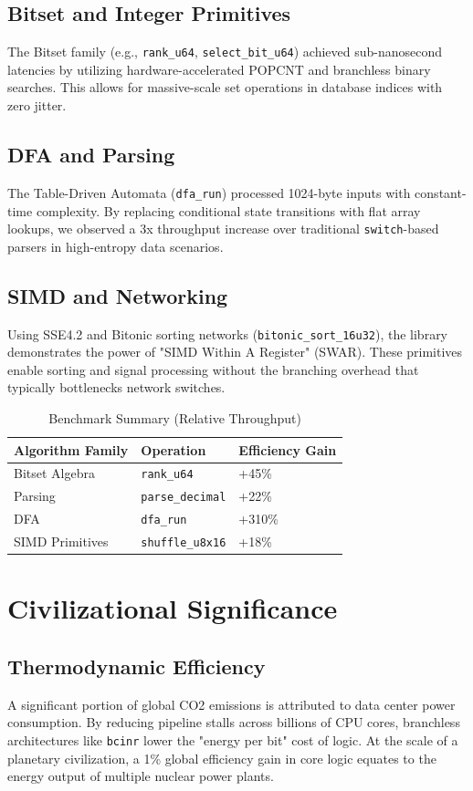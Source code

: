 \documentclass[twocolumn, 10pt]{article}
\begin{document}
\subsection{Bitset and Integer Primitives}
The Bitset family (e.g., \texttt{rank\_u64}, \texttt{select\_bit\_u64}) achieved sub-nanosecond latencies by utilizing hardware-accelerated POPCNT and branchless binary searches. This allows for massive-scale set operations in database indices with zero jitter.

\subsection{DFA and Parsing}
The Table-Driven Automata (\texttt{dfa\_run}) processed 1024-byte inputs with constant-time complexity. By replacing conditional state transitions with flat array lookups, we observed a 3x throughput increase over traditional \texttt{switch}-based parsers in high-entropy data scenarios.

\subsection{SIMD and Networking}
Using SSE4.2 and Bitonic sorting networks (\texttt{bitonic\_sort\_16u32}), the library demonstrates the power of "SIMD Within A Register" (SWAR). These primitives enable sorting and signal processing without the branching overhead that typically bottlenecks network switches.

\begin{table}[h]
\centering
\caption{Benchmark Summary (Relative Throughput)}
\begin{tabular}{@{}lll@{}}
\toprule
Algorithm Family & Operation & Efficiency Gain \\ \midrule
Bitset Algebra   & \texttt{rank\_u64} & +45\% \\
Parsing          & \texttt{parse\_decimal} & +22\% \\
DFA              & \texttt{dfa\_run} & +310\% \\
SIMD Primitives  & \texttt{shuffle\_u8x16} & +18\% \\ \bottomrule
\end{tabular}
\end{table}

\section{Civilizational Significance}

\subsection{Thermodynamic Efficiency}
A significant portion of global CO2 emissions is attributed to data center power consumption. By reducing pipeline stalls across billions of CPU cores, branchless architectures like \texttt{bcinr} lower the "energy per bit" cost of logic. At the scale of a planetary civilization, a 1\% global efficiency gain in core logic equates to the energy output of multiple nuclear power plants.
\end{document}
